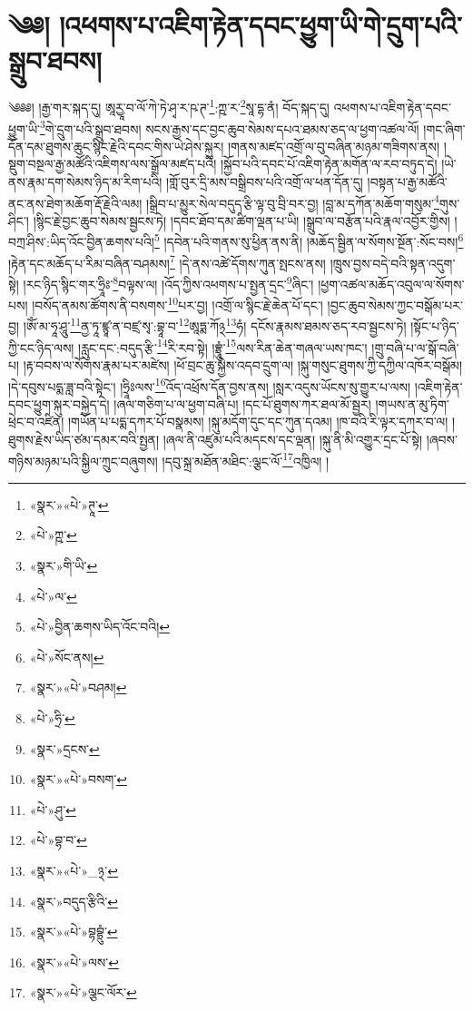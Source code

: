 \chapter{༄༅། །འཕགས་པ་འཇིག་རྟེན་དབང་ཕྱུག་ཡི་གེ་དྲུག་པའི་སྒྲུབ་ཐབས།}༄༅༅། །རྒྱ་གར་སྐད་དུ། ཨཱརྱཱ་བ་ལོ་ཀེ་ཏེ་ཤྭ་ར་ཥ་ཊ་\footnote{«སྣར་»«པེ་»ཊཱ་}:ཀྵ་ར་\footnote{«པེ་»ཀྵ་}སཱ་དྷ་ནཾ། བོད་སྐད་དུ། འཕགས་པ་འཇིག་རྟེན་དབང་ཕྱུག་ཡི་\footnote{«སྣར་»གི་ཡི་}གེ་དྲུག་པའི་སྒྲུབ་ཐབས། སངས་རྒྱས་དང་བྱང་ཆུབ་སེམས་དཔའ་ཐམས་ཅད་ལ་ཕྱག་འཚལ་ལོ། །གང་ཞིག་དོན་དམ་ཐུགས་ཆུང་སྙིང་རྗེའི་དབང་གིས་ཡེ་ཤེས་སྐུར། །གནས་མཛད་འགྲོ་ལ་བུ་བཞིན་མཉམ་གཟིགས་ནས། །སྡུག་བསྔལ་རྒྱ་མཚོའི་འཇིགས་ལས་སྒྲོལ་མཛད་པའི། །སྐྱོབ་པའི་དབང་པོ་འཇིག་རྟེན་མགོན་ལ་རབ་བཏུད་དེ། །ཡེ་ནས་རྣམ་དག་སེམས་ཉིད་མ་རིག་པའི། །གློ་བུར་དྲི་མས་བསྒྲིབས་པའི་འགྲོ་ལ་ཕན་དོན་དུ། །བསྟན་པ་རྒྱ་མཚོའི་ནང་ནས་ཐེག་མཆོག་རྡོ་རྗེའི་ལམ། །སྒྲིབ་པ་མྱུར་སེལ་བདུད་རྩི་ལྟ་བུ་བྲི་བར་བྱ། །བླ་མ་དཀོན་མཆོག་གསུམ་\footnote{«པེ་»ལ་}གུས་ཤིང་། །སྙིང་རྗེ་བྱང་ཆུབ་སེམས་སྦྱངས་ཏེ། །དབང་ཐོབ་དམ་ཚིག་ལྡན་པ་ཡི། །སྒྲུབ་ལ་བརྩོན་པའི་རྣལ་འབྱོར་གྱིས། །བཀྲ་ཤིས་:ཡིད་འོང་བྱིན་ཆགས་པའི།\footnote{«པེ་»བྱིན་ཆགས་ཡིད་འོང་བའི།} །དབེན་པའི་གནས་སུ་ཕྱིན་ནས་ནི། །མཆོད་སྦྱིན་ལ་སོགས་སྔོན་:སོང་བས།\footnote{«པེ་»སོང་ནས།} །རྟེན་དང་མཆོད་པ་རིམ་བཞིན་བཤམས།\footnote{«སྣར་»«པེ་»བཤམ།} །དེ་ནས་འཚེ་དོགས་ཀུན་སྤངས་ནས། །ཁྲུས་བྱས་བདེ་བའི་སྟན་འདུག་སྟེ། །རང་ཉིད་སྙིང་གར་ཧྲཱིཿ་\footnote{«པེ་»ཧྲི་}བལྟས་ལ། །འོད་ཀྱིས་འཕགས་པ་སྤྱན་དྲང་\footnote{«སྣར་»དྲངས་}ཞིང་། །ཕྱག་འཚལ་མཆོད་འབུལ་ལ་སོགས་པས། །བསོད་ནམས་ཚོགས་ནི་བསགས་\footnote{«སྣར་»«པེ་»བསག་}པར་བྱ། །འགྲོ་ལ་སྙིང་རྗེ་ཆེན་པོ་དང་། །བྱང་ཆུབ་སེམས་ཀྱང་བསྒོམ་པར་བྱ། །ཨོཾ་མ་ཧཱ་ཤཱུ་\footnote{«པེ་»ཤུ་}ནྱ་ཏཱ་ཛྙཱ་ན་བཛྲ་སྭ་:བྷཱ་བ་\footnote{«པེ་»བྷ་བ་}ཨཱཏྨ་ཀོ྅\footnote{«སྣར་»«པེ་»_྅་}ཧཾ། དངོས་རྣམས་ཐམས་ཅད་རབ་སྦྱངས་ཏེ། །སྟོང་པ་ཉིད་ཀྱི་ངང་ཉིད་ལས། །རླུང་དང་:བདུད་རྩི་\footnote{«སྣར་»བདུད་རྩིའི་}རི་རབ་སྟེ། །བྷྲཱུཾ་\footnote{«སྣར་»«པེ་»བྷབྷྲུཾ་}ལས་རིན་ཆེན་གཞལ་ཡས་ཁང་། །གྲུ་བཞི་པ་ལ་སྒོ་བཞི་པ། །རྟ་བབས་ལ་སོགས་རྣམ་པར་མཛེས། །ཕོ་བྲང་ཆུ་སྐྱེས་འདབ་དྲུག་ལ། །སྐུ་གསུང་ཐུགས་ཀྱི་དཀྱིལ་འཁོར་བསྒོམ། །དེ་དབུས་པདྨ་ཟླ་བའི་སྟེང་། །ཧྲཱིཿལས་\footnote{«སྣར་»«པེ་»ལས་}འོད་འཕྲོས་དོན་བྱས་ནས། །སླར་འདུས་ཡོངས་སུ་གྱུར་པ་ལས། །འཇིག་རྟེན་དབང་ཕྱུག་སྐུར་བསྐྱེད་དེ། །ཞལ་གཅིག་པ་ལ་ཕྱག་བཞི་པ། །དང་པོ་ཐུགས་ཀར་ཐལ་མོ་སྦྱར། །གཡས་ན་མུ་ཏིག་ཕྲེང་བ་འཛིན། །གཡོན་པ་པདྨ་དཀར་པོ་བསྣམས། །སྐུ་མདོག་དུང་དང་ཀུན་དའམ། །ཁ་བའི་རི་ལྟར་དཀར་བ་ལ། །ཐུགས་རྗེས་ཡིད་ཙམ་དམར་བའི་སྤྱན། །ཞལ་ནི་འཛུམ་པའི་མདངས་དང་ལྡན། །སྐུ་ནི་མི་འགྱུར་དྲང་པོ་སྟེ། །ཞབས་གཉིས་མཉམ་པའི་སྐྱིལ་ཀྲུང་བཞུགས། །དབུ་སྐྲ་མཐོན་མཐིང་:ལྕང་ལོ་\footnote{«སྣར་»«པེ་»ལྕང་ལོར་}འཁྱིལ། །
